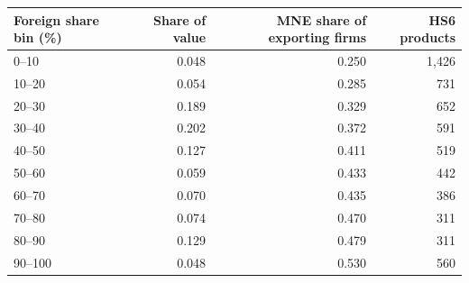 \begin{tabular}{lrrr}
\toprule
Foreign share bin (\%) & Share of value & MNE share of exporting firms & HS6 products \\
\midrule
0--10 & 0.048 & 0.250 & 1,426 \\
10--20 & 0.054 & 0.285 & 731 \\
20--30 & 0.189 & 0.329 & 652 \\
30--40 & 0.202 & 0.372 & 591 \\
40--50 & 0.127 & 0.411 & 519 \\
50--60 & 0.059 & 0.433 & 442 \\
60--70 & 0.070 & 0.435 & 386 \\
70--80 & 0.074 & 0.470 & 311 \\
80--90 & 0.129 & 0.479 & 311 \\
90--100 & 0.048 & 0.530 & 560 \\
\bottomrule
\end{tabular}
